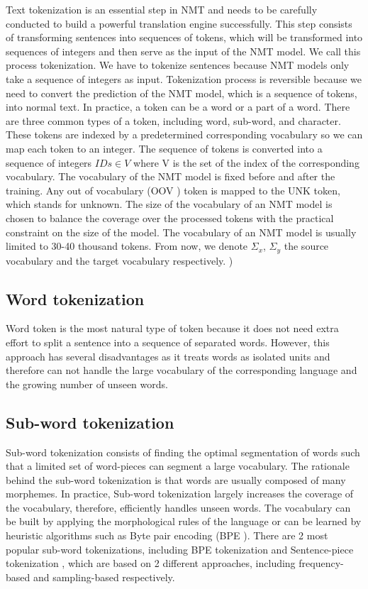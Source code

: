 Text tokenization is an essential step in NMT and needs to be carefully conducted to build a powerful translation engine successfully. This step consists of transforming sentences into sequences of tokens, which will be transformed into sequences of integers and then serve as the input of the NMT model. We call this process tokenization. We have to tokenize sentences because NMT models only take a sequence of integers as input. Tokenization process is reversible because we need to convert the prediction of the NMT model, which is a sequence of tokens, into normal text. In practice, a token can be a word or a part of a word. There are three common types of a token, including word, sub-word, and character. These tokens are indexed by a predetermined corresponding vocabulary so we can map each token to an integer. The sequence of tokens is converted into a sequence of integers $IDs \in V$ where V is the set of the index of the corresponding vocabulary. The vocabulary of the NMT model is fixed before and after the training. Any out of vocabulary (OOV ) token is mapped to the UNK token, which stands for unknown. The size of the vocabulary of an NMT model is chosen to balance the coverage over the processed tokens with the practical constraint on the size of the model. The vocabulary of an NMT model is usually limited to 30-40 thousand tokens. From now, we denote $\Sigma_{x}$, $\Sigma_y$ the source vocabulary and the target vocabulary respectively. )  
\subsection{Word tokenization}
Word token is the most natural type of token because it does not need extra effort to split a sentence into a sequence of separated words. However, this approach has several disadvantages as it treats words as isolated units and therefore can not handle the large vocabulary of the corresponding language and the growing number of unseen words.
\subsection{Sub-word tokenization}
Sub-word tokenization consists of finding the optimal segmentation of words such that a limited set of word-pieces can segment a large vocabulary. The rationale behind the sub-word tokenization is that words are usually composed of many morphemes. In practice, Sub-word tokenization largely increases the coverage of the vocabulary, therefore, efficiently handles unseen words. The vocabulary can be built by applying the morphological rules of the language or can be learned by heuristic algorithms such
as Byte pair encoding (BPE )\citep{Sennrich16neural,Mike12japanese,Gage94anew}. There are 2 most popular sub-word tokenizations, including BPE tokenization \citep{Sennrich16neural,Mike12japanese,Gage94anew} and Sentence-piece tokenization \citep{Taku18subword}, which are based on 2 different approaches, including frequency-based and sampling-based respectively.

